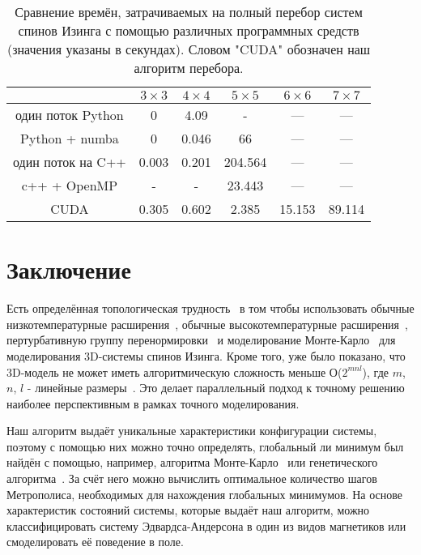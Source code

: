 \documentclass[10pt]{article}
\begin{document}
	\begin{table}[h]
		\begin{center}
			\label{Time_Table}
			\caption{Сравнение времён, затрачиваемых на полный перебор систем спинов Изинга с помощью различных программных средств (значения указаны в секундах). Словом "CUDA" обозначен наш алгоритм перебора.}
			\begin{tabular}{|c|c|c|c|c|c|}
				\hline
				& $3 \times 3$ & $4 \times 4$ & $5 \times 5$ & $6 \times 6$ & $7 \times 7$  \\ \hline
				один поток Python & 0            & 4.09         & -            & ---          & ---           \\ \hline
				Python + numba    & 0            & 0.046        & 66           & ---          & ---           \\ \hline
				один поток на C++ & 0.003        & 0.201        & 204.564      & ---          & ---           \\ \hline
				c++ + OpenMP      & -            & -            & 23.443       & ---          & ---           \\ \hline
				CUDA              & 0.305        & 0.602        & 2.385        & 15.153       & 89.114        \\ \hline
			\end{tabular}
		\end{center}
	\end{table}
	
	\section*{Заключение}
	Есть определённая топологическая трудность~\cite{zhang2018topological} в том чтобы использовать обычные низкотемпературные расширения~\cite{katz2007mathematics}, обычные высокотемпературные расширения~\cite{zhang2013mathematical}, пертурбативную группу перенормировки~\cite{zhang2016mathematical} и моделирование Монте-Карло~\cite{zhang2017nature} для моделирования 3D-системы спинов Изинга. Кроме того, уже было показано, что 3D-модель не может иметь алгоритмическую сложность меньше О($2^{mnl}$), где $m$, $n$, $l$ - линейные размеры~\cite{zhang2020computational}. Это делает параллельный подход к точному решению наиболее перспективным в рамках точного моделирования.
	
	Наш алгоритм выдаёт уникальные характеристики конфигурации системы, поэтому с помощью них можно точно определять, глобальный ли минимум был найдён с помощью, например, алгоритма Монте-Карло~\cite{janke2008monte} или генетического алгоритма~\cite{Panchenko2007}. За счёт него можно вычислить оптимальное количество шагов Метрополиса, необходимых для нахождения глобальных минимумов. На основе характеристик состояний системы, которые выдаёт наш алгоритм, можно классифицировать систему Эдвардса-Андерсона в один из видов магнетиков или смоделировать её поведение в поле.
	
\end{document}
